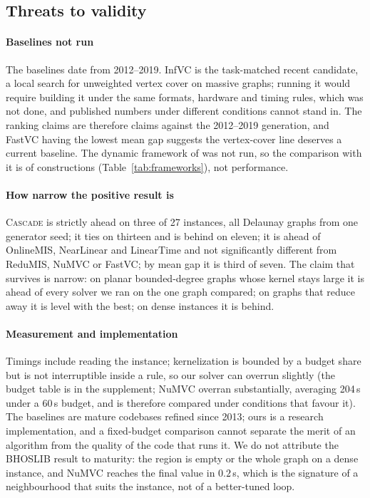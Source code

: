 \documentclass[review,authoryear,11pt]{elsarticle}
\theoremstyle{definition}
\begin{document}
\subsection{Threats to validity}
\label{sec:threats}

\paragraph{Baselines not run} The baselines date from 2012--2019. InfVC
\citep{sun2025infvc} is the task-matched recent candidate, a local search for unweighted
vertex cover on massive graphs; running it would require building it under the same
formats, hardware and timing rules, which was not done, and published numbers under
different conditions cannot stand in. The ranking claims are therefore claims against the
2012--2019 generation, and FastVC having the lowest mean gap suggests the vertex-cover line
deserves a current baseline. The dynamic framework of \citet{borowitz2025} was not run, so
the comparison with it is of constructions (Table~\ref{tab:frameworks}), not performance.

\paragraph{How narrow the positive result is} \textsc{Cascade} is strictly ahead on three
of 27 instances, all Delaunay graphs from one generator seed; it ties on thirteen and is
behind on eleven; it is ahead of OnlineMIS, NearLinear and LinearTime and not
significantly different from ReduMIS, NuMVC or FastVC; by mean gap it is third of seven.
The claim that survives is narrow: on planar bounded-degree graphs whose kernel stays
large it is ahead of every solver we ran on the one graph compared; on graphs that reduce
away it is level with the best; on dense instances it is behind.

\paragraph{Measurement and implementation} Timings include reading the instance;
kernelization is bounded by a budget share but is not interruptible inside a rule, so our
solver can overrun slightly (the budget table is in the supplement; NuMVC overran
substantially, averaging 204\,s under a 60\,s budget, and is therefore compared under
conditions that favour it). The baselines are mature codebases refined since 2013; ours is
a research implementation, and a fixed-budget comparison cannot separate the merit of an
algorithm from the quality of the code that runs it. We do not attribute the BHOSLIB result
to maturity: the region is empty or the whole graph on a dense instance, and NuMVC
reaches the final value in $0.2$\,s, which is the signature of a neighbourhood that suits
the instance, not of a better-tuned loop.
\end{document}
